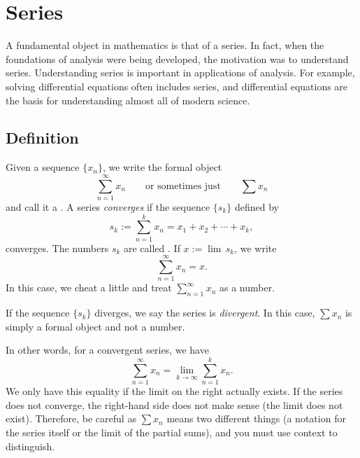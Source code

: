 \sectionnewpage
\section{Series}
\label{sec:series}


A fundamental object in mathematics is that of a series.  In fact, when
the foundations of analysis were being developed, the motivation was to
understand series.  Understanding series is important in applications
of analysis.  For example, solving differential equations often includes
series, and differential equations are the basis for understanding
almost all of modern science.

\subsection{Definition}

\begin{defn}
Given a sequence $\{ x_n \}$, we write the formal object
\begin{equation*}
\sum_{n=1}^\infty x_n
\qquad
\text{or sometimes just}
\qquad
\sum x_n
\end{equation*}
and call it a \emph{}.  A series
\emph{converges} if the sequence $\{ s_k \}$
defined by
\begin{equation*}
s_k := \sum_{n=1}^k x_n = x_1 + x_2 + \cdots + x_k ,
\end{equation*}
converges.
The numbers $s_k$ are called
\emph{}.
If $x := \lim\, s_k$, we write
\begin{equation*}
\sum_{n=1}^\infty x_n =  x .
\end{equation*}
In this case, we cheat a little and treat
$\sum_{n=1}^\infty x_n$ as a number.

If the sequence $\{ s_k \}$ diverges,
we say the series is \emph{divergent}.
In this case, $\sum x_n$ is simply a formal object and not a number.
\end{defn}

In other words, for a convergent series, we have
\begin{equation*}
\sum_{n=1}^\infty x_n
=
\lim_{k\to\infty} 
\sum_{n=1}^k x_n .
\end{equation*}
We only have this equality if the limit on
the right actually exists.  If the series does not converge, the right-hand
side does not make sense (the limit does not exist).
Therefore, be careful as 
$\sum x_n$ means two different things (a notation for the series itself 
or the limit of the partial sums), and you must use context
to distinguish.

